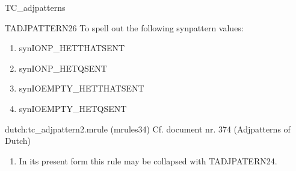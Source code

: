 \begin{mruleclass}{TC\_adjpatterns}
\begin{members}
\begin{member}
\end{member}
\begin{member}
 TADJPATTERN26
 To spell out the following synpattern values:
\begin{enumerate}
  \item synIONP\_HETTHATSENT
  \item  synIONP\_HETQSENT
  \item synIOEMPTY\_HETTHATSENT
  \item  synIOEMPTY\_HETQSENT
\end{enumerate}
\file dutch:tc\_adjpattern2.mrule (mrules34)
\semantics \nosemantics
\example Cf. document nr. 374 (Adjpatterns of Dutch)
\remarks\mbox{} 
\begin{enumerate}
\item In its present form this rule may be collapsed with TADJPATERN24.

\end{enumerate}


\end{member}

\end{members}

\end{mruleclass}
\newpage
